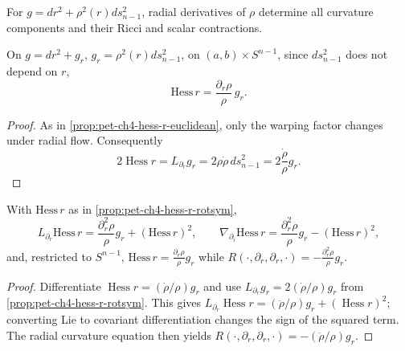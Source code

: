 For $g=dr^2+\rho^2(r)ds_{n-1}^2$, radial derivatives of $\rho$ determine all
curvature components and their Ricci and scalar contractions.

\begin{proposition}
  \label{prop:pet-ch4-hess-r-rotsym}
  On $g=dr^2+g_r$, $g_r=\rho^2(r)ds_{n-1}^2$, on $(a,b)\times S^{n-1}$, since
  $ds_{n-1}^2$ does not depend on $r$,
  \[
    \mathrm{Hess}\,r=\frac{\partial_r\rho}{\rho}\,g_r.
  \]
\end{proposition}
\begin{proof}
  \sketch
  As in \cref{prop:pet-ch4-hess-r-euclidean}, only the warping factor changes
  under radial flow. Consequently
  \[
    2\operatorname{Hess}r=L_{\partial_r}g_r
    =2\rho\dot\rho\,ds_{n-1}^2
    =2\frac{\dot\rho}{\rho}g_r.
  \]
\end{proof}

\begin{lemma}
  \label{lem:pet-ch4-hess-r-derivatives}
  With $\mathrm{Hess}\,r$ as in \cref{prop:pet-ch4-hess-r-rotsym},
  \[
    L_{\partial_r}\mathrm{Hess}\,r=\frac{\partial_r^2\rho}{\rho}g_r+(\mathrm{Hess}\,r)^2,
    \qquad
    \nabla_{\partial_i}\mathrm{Hess}\,r=\frac{\partial_r^2\rho}{\rho}g_r-(\mathrm{Hess}\,r)^2,
  \]
  and, restricted to $S^{n-1}$, $\mathrm{Hess}\,r=\tfrac{\partial_r\rho}{\rho}g_r$
  while $R(\cdot,\partial_r,\partial_r,\cdot)=-\tfrac{\partial_r^2\rho}{\rho}g_r$.
\end{lemma}
\begin{proof}
  \sketch
  Differentiate $\operatorname{Hess}r=(\dot\rho/\rho)g_r$ and use
  $L_{\partial_r}g_r=2(\dot\rho/\rho)g_r$ from
  \cref{prop:pet-ch4-hess-r-rotsym}. This gives
  $L_{\partial_r}\operatorname{Hess}r=(\ddot\rho/\rho)g_r+
  (\operatorname{Hess}r)^2$; converting Lie to covariant differentiation changes
  the sign of the squared term. The radial curvature equation then yields
  $R(\cdot,\partial_r,\partial_r,\cdot)=-(\ddot\rho/\rho)g_r$.
\end{proof}


